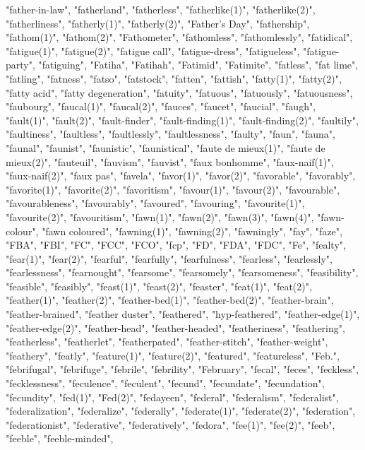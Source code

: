 "father-in-law",
"fatherland",
"fatherless",
"fatherlike(1)",
"fatherlike(2)",
"fatherliness",
"fatherly(1)",
"fatherly(2)",
"Father's Day",
"fathership",
"fathom(1)",
"fathom(2)",
"Fathometer",
"fathomless",
"fathomlessly",
"fatidical",
"fatigue(1)",
"fatigue(2)",
"fatigue call",
"fatigue-dress",
"fatigueless",
"fatigue-party",
"fatiguing",
"Fatiha",
"Fatihah",
"Fatimid",
"Fatimite",
"fatless",
"fat lime",
"fatling",
"fatness",
"fatso",
"fatstock",
"fatten",
"fattish",
"fatty(1)",
"fatty(2)",
"fatty acid",
"fatty degeneration",
"fatuity",
"fatuous",
"fatuously",
"fatuousness",
"faubourg",
"faucal(1)",
"faucal(2)",
"fauces",
"faucet",
"faucial",
"faugh",
"fault(1)",
"fault(2)",
"fault-finder",
"fault-finding(1)",
"fault-finding(2)",
"faultily",
"faultiness",
"faultless",
"faultlessly",
"faultlessness",
"faulty",
"faun",
"fauna",
"faunal",
"faunist",
"faunistic",
"faunistical",
"faute de mieux(1)",
"faute de mieux(2)",
"fauteuil",
"fauvism",
"fauvist",
"faux bonhomme",
"faux-naif(1)",
"faux-naif(2)",
"faux pas",
"favela",
"favor(1)",
"favor(2)",
"favorable",
"favorably",
"favorite(1)",
"favorite(2)",
"favoritism",
"favour(1)",
"favour(2)",
"favourable",
"favourableness",
"favourably",
"favoured",
"favouring",
"favourite(1)",
"favourite(2)",
"favouritism",
"fawn(1)",
"fawn(2)",
"fawn(3)",
"fawn(4)",
"fawn-colour",
"fawn coloured",
"fawning(1)",
"fawning(2)",
"fawningly",
"fay",
"faze",
"FBA",
"FBI",
"FC",
"FCC",
"FCO",
"fcp",
"FD",
"FDA",
"FDC",
"Fe",
"fealty",
"fear(1)",
"fear(2)",
"fearful",
"fearfully",
"fearfulness",
"fearless",
"fearlessly",
"fearlessness",
"fearnought",
"fearsome",
"fearsomely",
"fearsomeness",
"feasibility",
"feasible",
"feasibly",
"feast(1)",
"feast(2)",
"feaster",
"feat(1)",
"feat(2)",
"feather(1)",
"feather(2)",
"feather-bed(1)",
"feather-bed(2)",
"feather-brain",
"feather-brained",
"feather duster",
"feathered",
"hyp-feathered",
"feather-edge(1)",
"feather-edge(2)",
"feather-head",
"feather-headed",
"featheriness",
"feathering",
"featherless",
"featherlet",
"featherpated",
"feather-stitch",
"feather-weight",
"feathery",
"featly",
"feature(1)",
"feature(2)",
"featured",
"featureless",
"Feb.",
"febrifugal",
"febrifuge",
"febrile",
"febrility",
"February",
"fecal",
"feces",
"feckless",
"fecklessness",
"feculence",
"feculent",
"fecund",
"fecundate",
"fecundation",
"fecundity",
"fed(1)",
"Fed(2)",
"fedayeen",
"federal",
"federalism",
"federalist",
"federalization",
"federalize",
"federally",
"federate(1)",
"federate(2)",
"federation",
"federationist",
"federative",
"federatively",
"fedora",
"fee(1)",
"fee(2)",
"feeb",
"feeble",
"feeble-minded",
